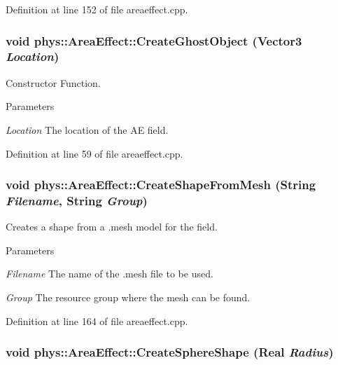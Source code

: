 Definition at line 152 of file areaeffect.cpp.

\hypertarget{classphys_1_1AreaEffect_a31e4c0fee03dca66ba4c49727b20f58d}{
\subsubsection[{CreateGhostObject}]{\setlength{\rightskip}{0pt plus 5cm}void phys::AreaEffect::CreateGhostObject ({\bf Vector3} {\em Location})}}
\label{d4/d55/classphys_1_1AreaEffect_a31e4c0fee03dca66ba4c49727b20f58d}


Constructor Function. 


\begin{DoxyParams}{Parameters}
\item[{\em Location}]The location of the AE field. \end{DoxyParams}


Definition at line 59 of file areaeffect.cpp.

\hypertarget{classphys_1_1AreaEffect_a341fb24b93bdd0994ce44ce0be571685}{
\subsubsection[{CreateShapeFromMesh}]{\setlength{\rightskip}{0pt plus 5cm}void phys::AreaEffect::CreateShapeFromMesh ({\bf String} {\em Filename}, \/  {\bf String} {\em Group})}}
\label{d4/d55/classphys_1_1AreaEffect_a341fb24b93bdd0994ce44ce0be571685}


Creates a shape from a .mesh model for the field. 


\begin{DoxyParams}{Parameters}
\item[{\em Filename}]The name of the .mesh file to be used. \item[{\em Group}]The resource group where the mesh can be found. \end{DoxyParams}


Definition at line 164 of file areaeffect.cpp.

\hypertarget{classphys_1_1AreaEffect_aa794048d274ea12775b14de39171f14d}{
\subsubsection[{CreateSphereShape}]{\setlength{\rightskip}{0pt plus 5cm}void phys::AreaEffect::CreateSphereShape ({\bf Real} {\em Radius})}}
\label{d4/d55/classphys_1_1AreaEffect_aa794048d274ea12775b14de39171f14d}



